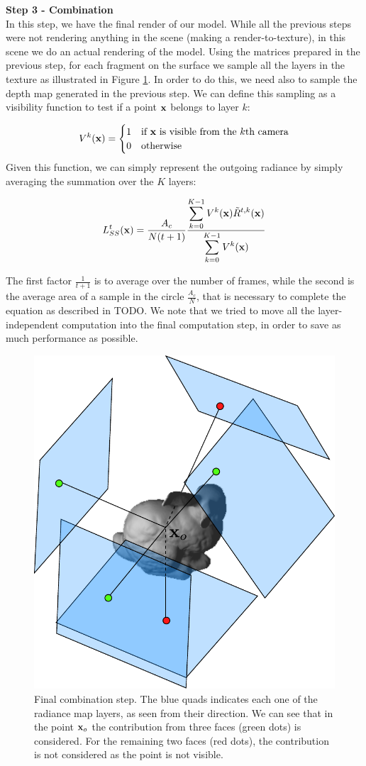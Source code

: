 \textbf{Step 3 - Combination} \\
In this step, we have the final render of our model. While all the previous steps were not rendering anything in the scene (making a render-to-texture), in this scene we do an actual rendering of the model. Using the matrices prepared in the previous step, for each fragment on the surface we sample all the layers in the texture as illustrated in Figure \ref{fig:step3}. In order to do this, we need also to sample the depth map generated in the previous step. We can define this sampling as a visibility function to test if a point $\mathbf{x}$ belongs to layer $k$:

$$
V^k(\mathbf{x}) = \begin{cases}
1 & \text{if $\mathbf{x}$ is visible from the $k$th camera} \\
0 & \text{otherwise}
\end{cases}
$$
Given this function, we can simply represent the outgoing radiance by simply averaging the summation over the $K$ layers:

$$
L_{SS}^t(\mathbf{x}) = \frac{A_c}{N (t + 1)} \frac{\displaystyle\sum_{k = 0}^{K-1}V^k(\mathbf{x}) \tilde{R}^{t,k}(\mathbf{x})}{\displaystyle\sum_{k = 0}^{K-1}V^k(\mathbf{x})}
$$

The first factor $\frac{1}{t + 1}$ is to average over the number of frames, while the second is the average area of a sample in the circle $\frac{A_c}{N}$, that is necessary to complete the equation as described in TODO. We note that we tried to move all the layer-independent computation into the final computation step, in order to save as much performance as possible. 

\begin{figure}[!ht]
\centering
\includegraphics[width=0.6 \linewidth]{images/method/combination.pdf}
\caption{Final combination step. The blue quads indicates each one of the radiance map layers, as seen from their direction. We can see that in the point $\mathbf{x}_o$ the contribution from three faces (green dots) is considered. For the remaining two faces (red dots), the contribution is not considered as the point is not visible.}
\label{fig:step3}
\end{figure} 

